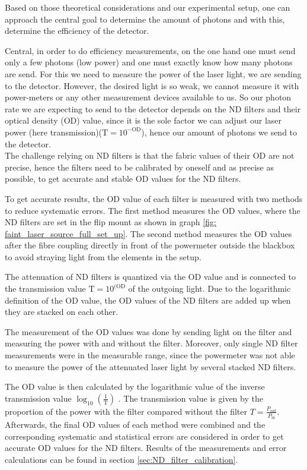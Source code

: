 Based on those theoretical considerations and our experimental setup, one can approach the central goal to determine the
amount of photons and with this, determine the efficiency of the detector.

Central, in order to do efficiency measurements, on the one hand one must send only a few photons (low power) and one must
exactly know how many photons are send.
For this we need to measure the power of the laser light, we are sending to the detector.
However, the desired light is so weak, we cannot measure it with power-meters or any other measurement devices available to us.
So our photon rate we are expecting to send to the detector depends on the ND filters and their optical density (OD) value, since it is the sole factor
we can adjust our laser power (here transmission)($\text{T} = 10^{-\text{OD}}$), hence our amount of photons we send to the detector.\\

The challenge relying on ND filters is that the fabric values of their OD are not precise, hence the filters need to be calibrated by oneself and 
as precise as possible, to get accurate and stable OD values for the ND filters.

To get accurate results, the OD value of each filter is measured with two methods to reduce systematic errors.
The first method measures the OD values, where the ND filters are set in the flip mount as shown in graph \ref{fig: faint_laser_source_full_set_up}.
The second method measures the OD values after the fibre coupling directly in front of the powermeter
outside the blackbox to avoid straying light from the elements in the setup.

The attenuation of ND filters is quantized via the OD value and is connected to the transmission value $ \text{T} = 10^{(\text{OD}}$ of the outgoing light.
Due to the logarithmic definition of the OD value, the OD values of the ND filters are added up when they are stacked on each other.

The measurement of the OD values was done by sending light on the filter and measuring the power with and without the filter.
Moreover, only single ND filter measurements were in the measurable range, since the powermeter was not able 
to measure the power of the attenuated laser light by several stacked ND filters. 

The OD value is then calculated by the logarithmic value of the inverse transmission value $\log_{10}(\frac{1}{\text{T}})$ .
The transmission value is given by the proportion of the power with the filter compared without the filter $T = \frac{P_{\text{out}}}{P_{\text{in}}}$.
Afterwards, the final OD values of each method were combined and the corresponding systematic and statistical errors are
considered in order to get accurate OD values for the ND filters.
Results of the measurements and error calculations can be found in section \ref{sec:ND_filter_calibration}.

